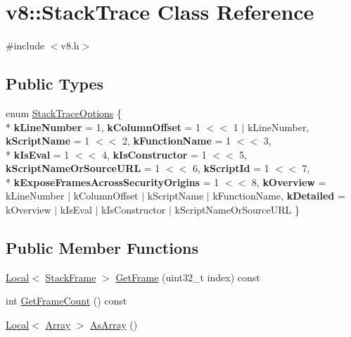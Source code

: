 \hypertarget{classv8_1_1StackTrace}{}\section{v8\+:\+:Stack\+Trace Class Reference}
\label{classv8_1_1StackTrace}


{\ttfamily \#include $<$v8.\+h$>$}

\subsection*{Public Types}
\begin{DoxyCompactItemize}
\item 
enum \hyperlink{classv8_1_1StackTrace_a9704e4a37949eb8eb8ccddbddf161492}{Stack\+Trace\+Options} \{ \\*
{\bfseries k\+Line\+Number} = 1, 
{\bfseries k\+Column\+Offset} = 1 $<$$<$ 1 $\vert$ k\+Line\+Number, 
{\bfseries k\+Script\+Name} = 1 $<$$<$ 2, 
{\bfseries k\+Function\+Name} = 1 $<$$<$ 3, 
\\*
{\bfseries k\+Is\+Eval} = 1 $<$$<$ 4, 
{\bfseries k\+Is\+Constructor} = 1 $<$$<$ 5, 
{\bfseries k\+Script\+Name\+Or\+Source\+U\+RL} = 1 $<$$<$ 6, 
{\bfseries k\+Script\+Id} = 1 $<$$<$ 7, 
\\*
{\bfseries k\+Expose\+Frames\+Across\+Security\+Origins} = 1 $<$$<$ 8, 
{\bfseries k\+Overview} = k\+Line\+Number $\vert$ k\+Column\+Offset $\vert$ k\+Script\+Name $\vert$ k\+Function\+Name, 
{\bfseries k\+Detailed} = k\+Overview $\vert$ k\+Is\+Eval $\vert$ k\+Is\+Constructor $\vert$ k\+Script\+Name\+Or\+Source\+U\+RL
 \}
\end{DoxyCompactItemize}
\subsection*{Public Member Functions}
\begin{DoxyCompactItemize}
\item 
\hyperlink{classv8_1_1Local}{Local}$<$ \hyperlink{classv8_1_1StackFrame}{Stack\+Frame} $>$ \hyperlink{classv8_1_1StackTrace_a6fd5ba809b5d87032d70d32f0b1a80e8}{Get\+Frame} (uint32\+\_\+t index) const 
\item 
int \hyperlink{classv8_1_1StackTrace_aafafebce6c034f1f6f4a870e8f52431e}{Get\+Frame\+Count} () const 
\item 
\hyperlink{classv8_1_1Local}{Local}$<$ \hyperlink{classv8_1_1Array}{Array} $>$ \hyperlink{classv8_1_1StackTrace_abd36f712b3ab986b572aa259b06bf5bd}{As\+Array} ()
\end{DoxyCompactItemize}
